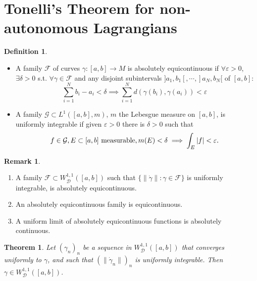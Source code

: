 \documentclass[12pt]{amsart}
\theoremstyle{plain}
\newtheorem{theorem}{Theorem}
\theoremstyle{definition}
\newtheorem{definition}{Definition}
\newtheorem{remark}{Remark}
\newcommand{\cD}{\mathcal D}
\newcommand{\cW}{W^{1,1}}
\newcommand{\cWD}{\cW_\cD}
\newcommand{\cF}{\mathcal F}
\newcommand{\cG}{\mathcal G}
\newcommand{\ep}{\varepsilon}
\newcommand{\ga}{\gamma}
\newcommand{\de}{\delta}
\newcommand{\dga}{\dot\gamma}
\begin{document}
 \section{Tonelli's Theorem for non-autonomous Lagrangians}
\label{sec:tonelli}
\begin{definition}\quad
  \begin{itemize} 
   \item  A family $\cF$  of curves $\ga:[a,b]\to M$ is absolutely
  equicontinuous if $\forall\ep>0$, $\exists\de>0$
  s.t. $\forall\ga\in\cF$ and any  disjoint subintervals $ ]a_1,b_1[,\cdots,]a_N,b_N[$ 
 of $[a,b]$:
  \[\sum_{i=1}^Nb_i-a_i<\de\implies \sum_{i=1}^Nd(\ga(b_i),\ga(a_i))<\ep\]
\item A
 family $\cG\subset L^1([a,b],m)$,  $m$ the Lebesgue measure on
 $[a,b]$, is uniformly integrable 
if given $\ep>0$ there is $\de>0$ such that 
\[f\in\cG, E\subset[a,b]\hbox{ measurable}, m(E)<\de\implies
  \int_E|f|<\ep.\]
   \end{itemize}
 
\end{definition}
\begin{remark}\label{basic}\quad
  \begin{enumerate}
  \item  A family $\cF\subset\cWD([a,b])$ such that $\{\|\dga\| : \ga\in\cF\}$
    is uniformly integrable, is absolutely equicontinuous.
  \item An absolutely equicontinuous family is equicontinuous.
  \item A uniform limit of absolutely equicontinuous  functions
    is absolutely continuous.
    \end{enumerate}
\end{remark}
\begin{theorem}{\cite{SM}}\label{hor}
  Let $(\ga_n)_n$ be a sequence in $\cWD([a,b])$ that converges uniformly to
  $\ga$, and such that
  $( \|\dga _n\|)_n$ is uniformly integrable.   Then $\ga\in\cWD([a,b])$.
  \end{theorem}
\end{document}
